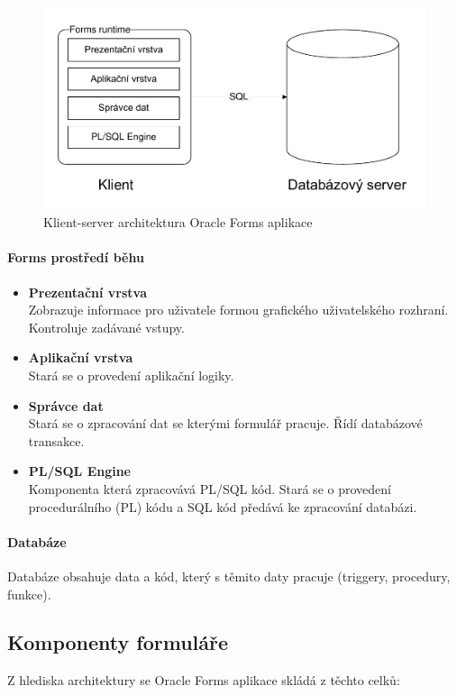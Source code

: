 \documentclass{diplomka}
\begin{document}
\begin{figure}[H]
  \centering
  \includegraphics[scale=0.7]{visio/arch.pdf}
\caption{Klient-server architektura Oracle Forms aplikace}
\label{fig:arch}
\end{figure}
\paragraph{Forms prostředí běhu}
\begin{itemize}[noitemsep,nolistsep]
\item \textbf{Prezentační vrstva}\\
Zobrazuje informace pro uživatele formou grafického uživatelského rozhraní. Kontroluje zadávané vstupy.
\item \textbf{Aplikační vrstva}\\
Stará se o provedení aplikační logiky.
\item \textbf{Správce dat}\\
Stará se o zpracování dat se kterými formulář pracuje. Řídí databázové transakce.
\item \textbf{PL/SQL Engine}\\
Komponenta která zpracovává PL/SQL kód. Stará se o provedení procedurálního (PL) kódu a SQL kód předává ke zpracování databázi.
\end{itemize}

\paragraph{Databáze}
Databáze obsahuje data a kód, který s těmito daty pracuje (triggery, procedury, funkce). 

\newpage
\subsection{Komponenty formuláře}
\label{components}
Z hlediska architektury se Oracle Forms aplikace skládá z těchto celků:
\end{document}
